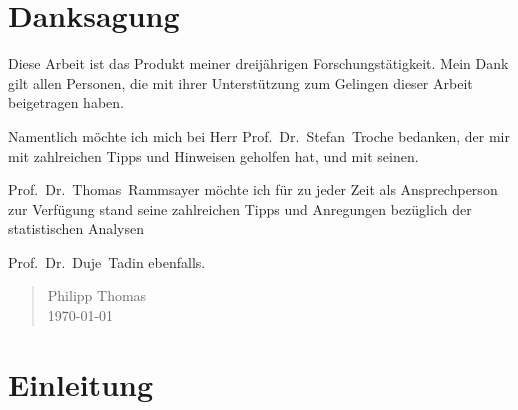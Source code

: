 \documentclass[11pt, twoside, a4paper]{book}		%
\begin{document}
\renewcommand{\contentsname}{Inhalte}			%
\setcounter{tocdepth}{3}						%
\tableofcontents								%




\clearpage
\chapter*{\LARGE Danksagung}
\vspace{-.7cm}
Diese Arbeit ist das Produkt meiner dreijährigen Forschungstätigkeit. Mein Dank gilt allen Personen, die mit ihrer Unterstützung zum Gelingen dieser Arbeit beigetragen haben.

Namentlich möchte ich mich bei Herr \mbox{Prof. Dr. Stefan Troche} bedanken, der mir mit zahlreichen Tipps und Hinweisen geholfen hat, und mit seinen.

\mbox{Prof. Dr. Thomas Rammsayer} möchte ich für zu jeder Zeit als Ansprechperson zur Verfügung stand seine zahlreichen Tipps und Anregungen bezüglich der statistischen Analysen


\mbox{Prof. Dr. Duje Tadin} ebenfalls. 




\vspace{6 mm}

\begin{quote}
Philipp Thomas\\
\today
\end{quote}





\mainmatter				%


\chapter{Einleitung \label{cha:Einleitung}}
\end{document}
